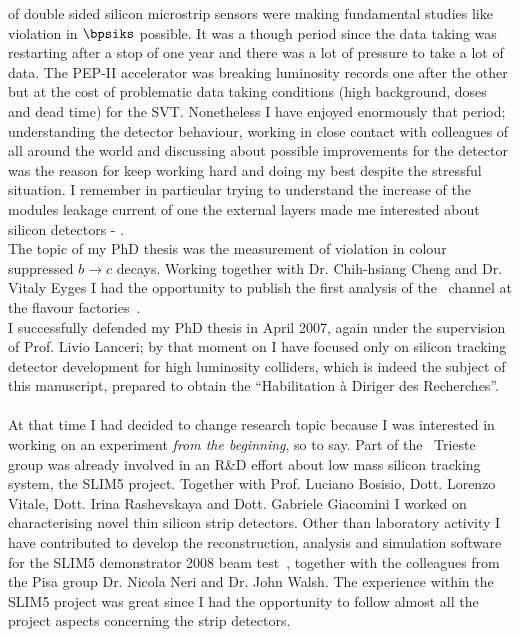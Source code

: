 of double sided silicon microstrip sensors were making fundamental studies like \CP violation in $\bpsiks$ 
possible. It was a though period since the data taking was restarting after a stop of one year and there 
was a lot of pressure to take a lot of data. The PEP-II accelerator was breaking luminosity records 
one after the other but at the cost of problematic data taking conditions (high background, doses 
and dead time) for the SVT. Nonetheless I have enjoyed enormously that period; understanding 
the detector behaviour, working in close contact with colleagues of all around the world and discussing 
about possible improvements for the detector was the reason for keep working hard and doing my best 
despite the stressful situation. I remember in particular trying to understand the increase of the modules 
leakage current of one the external layers made me interested about silicon detectors 
- \cite{doi:10.1142/9789812773678_0168}.
\\The topic of my PhD thesis was the measurement of \CP violation in colour suppressed $b\to c$ decays.
Working together with Dr. Chih-hsiang Cheng and Dr.  Vitaly Eyges I had the opportunity to publish 
the first analysis of the \BDh\ channel at the flavour factories~\cite{PhysRevLett.99.081801}.
\\ I successfully defended my PhD thesis in April 2007, again under the supervision of Prof. Livio Lanceri;
  by that moment on I have focused only on 
silicon tracking detector development for high luminosity colliders, which is indeed the subject of this 
manuscript, prepared to obtain the  ``Habilitation \`a Diriger des Recherches''.
\\
\\
At that time I had decided to change research topic because I was interested in working on an experiment 
{\it from the beginning}, so to say. Part of the   \babar\ Trieste group was already involved in an R\&D 
effort about low mass silicon tracking system, the SLIM5 project. 
Together with Prof. Luciano Bosisio, Dott. Lorenzo Vitale, Dott. Irina Rashevskaya and Dott. Gabriele 
Giacomini I worked on characterising novel thin silicon strip detectors. Other than laboratory activity 
I have contributed to develop the reconstruction, analysis and simulation software for the SLIM5 
demonstrator 2008 beam test~\cite{BETTARINI2010942}, together with the colleagues from the Pisa group 
Dr. Nicola Neri and Dr. John Walsh.  
The experience within the SLIM5 project  was great since I had the opportunity to follow almost all the  
project aspects concerning the strip detectors. 
